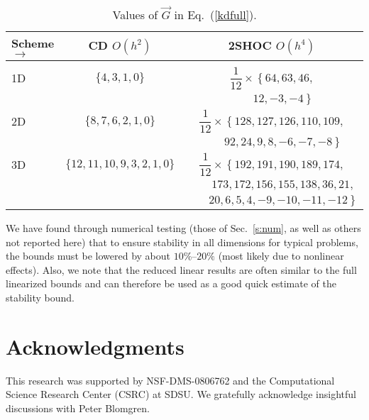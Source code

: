 \documentclass{article}
\begin{document}
\begin{table}[htbp] 
\caption{Values of $\vec G$ in Eq.~(\ref{kdfull}).}
\begin{center}
\begin{tabular}{|l|c|c|} \hline
Scheme $\rightarrow$ & CD $O(h^2)$         & 2SHOC $O(h^4)$ 
\\ \hline
\;     & \;                  &\;              
\\
1D     & $\{4,3,1,0\}$       &$\dfrac{1}{12} \times \left\{64,63,46, \right.$     
\\
       & \;                  &$\left. \qquad 12,-3,-4 \right\}$
\\
2D     & $\{8,7,6,2,1,0\}$   &  $\dfrac{1}{12} \times \left\{128,127,126,110,109,\right.$ 
\\
\;     &  \;                 & $\left.  \qquad 92,24,9,8,-6,-7,-8 \right\} $
\\
3D     & $\{12,11,10,9,3,2,1,0\}$  & $\dfrac{1}{12} \times \left\{192,191,190,189,174,\right.$
\\
\;     & \;                        & $\qquad 173,172,156,155,138,36,21,$
\\
\;     & \;                        & $\qquad \left. 20,6,5,4,-9,-10,-11,-12 \right\}$  
\\ \hline
\end{tabular}
\end{center}
\label{t:sumresults}
\end{table}

We have found through numerical testing (those of Sec.~\ref{s:num}, as well as others not reported here) that to ensure stability in all dimensions for typical problems, the bounds must be lowered by about $10\%$--$20\%$ (most likely due to nonlinear effects).  Also, we note that the reduced linear results are often similar to the full linearized bounds and can therefore be used as a good quick estimate of the stability bound.

\section*{Acknowledgments}
This research was supported by NSF-DMS-0806762 and the Computational
Science Research Center (CSRC) at SDSU.
We gratefully acknowledge insightful discussions with Peter Blomgren.

\def\myitemsep{5pt}

  
\end{document}
